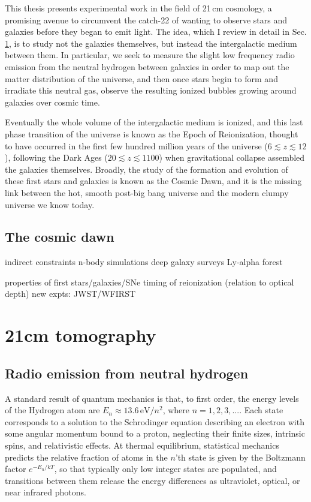 This thesis presents experimental work in the field of 21\,cm cosmology, a promising avenue to circumvent the catch-22 of wanting to observe stars and galaxies before they began to emit light. The idea, which I review in detail in Sec. \ref{sec:intro21cmsection}, is to study not the galaxies themselves, but instead the intergalactic medium between them. In particular, we seek to measure the slight low frequency radio emission from the neutral hydrogen between galaxies in order to map out the matter distribution of the universe, and then once stars begin to form and irradiate this neutral gas, observe the resulting ionized bubbles growing around galaxies over cosmic time. 

Eventually the whole volume of the intergalactic medium is ionized, and this last phase transition of the universe is known as the Epoch of Reionization, thought to have occurred in the first few hundred million years of the universe ($6\lesssim z\lesssim12$), following the Dark Ages ($20\lesssim z\lesssim 1100$) when gravitational collapse assembled the galaxies themselves. Broadly, the study of the formation and evolution of these first stars and galaxies is known as the Cosmic Dawn, and it is the missing link between the hot, smooth post-big bang universe and the modern clumpy universe we know today.

\subsection{The cosmic dawn}
indirect constraints
n-body simulations
deep galaxy surveys
 Ly-alpha forest
 
properties of first stars/galaxies/SNe
timing of reionization (relation to optical depth)
new expts: JWST/WFIRST

\section{21cm tomography}
\label{sec:intro21cmsection}

\subsection{Radio emission from neutral hydrogen}

A standard result of quantum mechanics \citep[e.g.,][]{griffithsqm} is that, to first order, the energy levels of the Hydrogen atom are $E_n\approx13.6\,\text{eV}/n^2$, where $n=1,2,3,...$. Each state corresponds to a solution to the Schrodinger equation describing an electron with some angular momentum bound to a proton, neglecting their finite sizes, intrinsic spins, and relativistic effects. At thermal equilibrium, statistical mechanics predicts the relative fraction of atoms in the $n$'th state is given by the Boltzmann factor $e^{-E_n/kT}$, so that typically only low integer states are populated, and transitions between them release the energy differences as ultraviolet, optical, or near infrared photons. 

